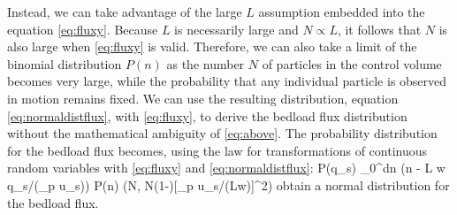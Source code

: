Instead, we can take advantage of the large $L$ assumption embedded into the equation \ref{eq:fluxy}. 
Because $L$ is necessarily large and $N \propto L$, it follows that $N$ is also large when \ref{eq:fluxy} is valid. 
Therefore, we can also take a limit of the binomial distribution $P(n)$ as the number $N$ of particles in the control volume becomes very large, while the probability that any individual particle is observed in motion remains fixed. 
We can use the resulting distribution, equation \ref{eq:normaldistflux}, with \ref{eq:fluxy}, to derive the bedload flux distribution without the mathematical ambiguity of \ref{eq:above}. 
The probability distribution for the bedload flux becomes, using the law for transformations of continuous random variables \citep[e.g.][]{Feller1968} with \ref{eq:fluxy} and \ref{eq:normaldistflux}:
\be P(q_s) \approx \int_0^\infty dn \delta(n - L w q_s/(\nu_p u_s)) P(n) \approx {}\big(N\xi [\nu_p u_s/(Lw)], N\xi(1-\xi)[\nu_p u_s/(Lw)]^2\big) \label{eq:anceygauss}\ee
\citet{Ancey2006} obtain a normal distribution for the bedload flux. 

